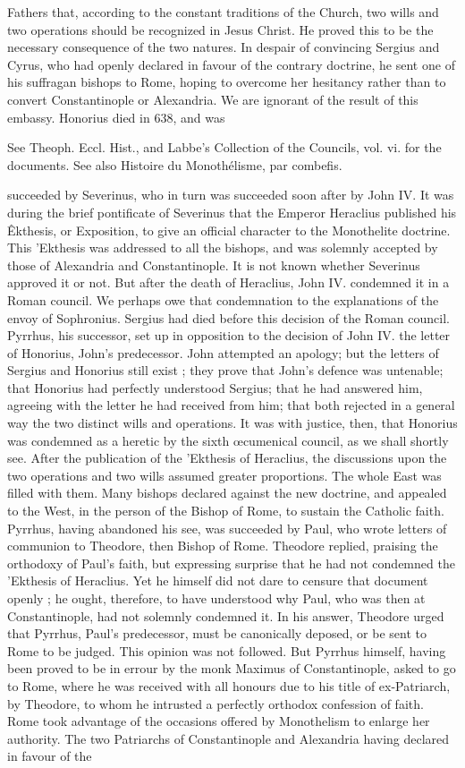 Fathers that, according to the constant traditions of the Church, two wills and two operations should be recognized in Jesus Christ. He proved this to be the necessary consequence of the two natures. In despair of convincing Sergius and Cyrus, who had openly declared in favour of the contrary doctrine, he sent one of his suffragan bishops to Rome, hoping to overcome her hesitancy rather than to convert Constantinople or Alexandria. We are ignorant of the result of this embassy. Honorius died in 638, and was

See Theoph. Eccl. Hist., and Labbe’s Collection of the Councils, vol. vi. for the documents. See also Histoire du Monothélisme, par combefis.

succeeded by Severinus, who in turn was succeeded soon after by John IV. It was during the brief pontificate of Severinus that the Emperor Heraclius published his Êkthesis, or Exposition, to give an official character to the Monothelite doctrine. This 'Ekthesis was addressed to all the bishops, and was solemnly accepted by those of Alexandria and Constantinople. It is not known whether Severinus approved it or not. But after the death of Heraclius, John IV. condemned it in a Roman council. We perhaps owe that condemnation to the explanations of the envoy of Sophronius. Sergius had died before this decision of the Roman council. Pyrrhus, his successor, set up in opposition to the decision of John IV. the letter of Honorius, John's predecessor. John attempted an apology; but the letters of Sergius and Honorius still exist ; they prove that John's defence was untenable; that Honorius had perfectly understood Sergius; that he had answered him, agreeing with the letter he had received from him; that both rejected in a general way the two distinct wills and operations. It was with justice, then, that Honorius was condemned as a heretic by the sixth œcumenical council, as we shall shortly see. After the publication of the 'Ekthesis of Heraclius, the discussions upon the two operations and two wills assumed greater proportions. The whole East was filled with them. Many bishops declared against the new doctrine, and appealed to the West, in the person of the Bishop of Rome, to sustain the Catholic faith. Pyrrhus, having abandoned his see, was succeeded by Paul, who wrote letters of communion to Theodore, then Bishop of Rome. Theodore replied, praising the orthodoxy of Paul's faith, but expressing surprise that he had not condemned the 'Ekthesis of Heraclius. Yet he himself did not dare to censure that document openly ; he ought, therefore, to have understood why Paul, who was then at Constantinople, had not solemnly condemned it. In his answer, Theodore urged that Pyrrhus, Paul's predecessor, must be canonically deposed, or be sent to Rome to be judged. This opinion was not followed. But Pyrrhus himself, having been proved to be in errour by the monk Maximus of Constantinople, asked to go to Rome, where he was received with all honours due to his title of ex-Patriarch, by Theodore, to whom he intrusted a perfectly orthodox confession of faith. Rome took advantage of the occasions offered by Monothelism to enlarge her authority. The two Patriarchs of Constantinople and Alexandria having declared in favour of the 